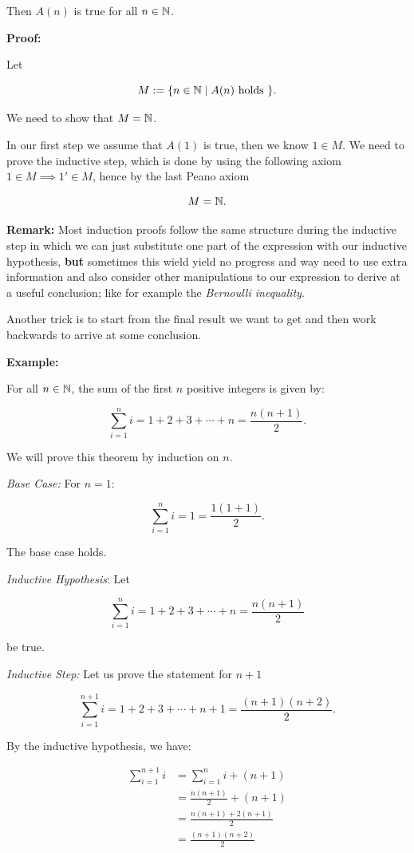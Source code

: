 Then \(A(n)\) is true for all \(n \in \mathbb{N}\).

\textbf{Proof:}

Let

\[
	M := \{n \in \mathbb{N} \mid A(n) \text{ holds }\}.
\]

We need to show that \(M = \mathbb{N}\).

In our first step we assume that \(A(1)\) is true, then we know \(1 \in M\). We need to prove the
inductive step, which is done by using the following axiom \(1 \in M \implies 1' \in M\), hence by the last
Peano axiom

\[
	M = \mathbb{N}.
\]

\QED

\textbf{Remark:} Most induction proofs follow the same structure during the inductive step in which we can just substitute one part of the expression
with our inductive hypothesis, \textbf{but} sometimes this wield yield no progress and way need to use extra information and also consider
other manipulations to our expression to derive at a useful conclusion; like for example the \emph{Bernoulli inequality}.

Another trick is to start from the final result we want to get and then work backwards to arrive at some conclusion.

\textbf{Example:}

For all \( n \in \mathbb{N} \), the sum of the first \(n\) positive integers is given by:

\[
	\sum_{i = 1}^{n} i = 1 + 2 + 3 + \cdots + n = \frac{n(n+1)}{2}.
\]

We will prove this theorem by induction on \(n\).

\emph{Base Case:} For \( n = 1 \):

\[
	\sum_{i = 1}^{n} i = 1 = \frac{1(1+1)}{2}.
\]

The base case holds.

\emph{Inductive Hypothesis}: Let

\[
	\sum_{i = 1}^{n} i = 1 + 2 + 3 + \cdots + n = \frac{n(n+1)}{2}
\]

be true.

\emph{Inductive Step:} Let us prove the statement for  \(n + 1\)

\[
	\sum_{i = 1}^{n + 1} i = 1 + 2 + 3 + \cdots + n + 1= \frac{(n + 1)(n + 2)}{2}.
\]

By the inductive hypothesis, we have:

\begin{align*}
	\sum_{i = 1}^{n + 1} i & = \sum_{i = 1}^{n} i + (n + 1) \\
	                       & = \frac{n(n+1)}{2} + (n + 1)   \\
	                       & = \frac{n(n+1) + 2(n + 1)}{2}  \\
	                       & = \frac{(n + 1)(n + 2)}{2}
\end{align*}

